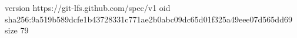 version https://git-lfs.github.com/spec/v1
oid sha256:9a519b589dcfe1b43728331c771ae2b0abc09dc65d01f325a49eee07d565dd69
size 79
